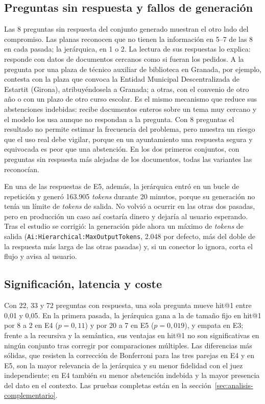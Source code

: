 \subsection{Preguntas sin respuesta y fallos de generación}
\label{sec:resultados-fallos}

Las 8 preguntas sin respuesta del conjunto generado muestran el otro lado del compromiso. Las planas reconocen que no tienen la información en 5--7 de las 8 en cada pasada; la jerárquica, en 1 o 2. La lectura de sus respuestas lo explica: responde con datos de documentos cercanos como si fueran los pedidos. A la pregunta por una plaza de técnico auxiliar de biblioteca en Granada, por ejemplo, contesta con la plaza que convoca la Entidad Municipal Descentralizada de Estartit (Girona), atribuyéndosela a Granada; a otras, con el convenio de otro año o con un plazo de otro curso escolar. Es el mismo mecanismo que reduce sus abstenciones indebidas: recibe documentos enteros sobre un tema muy cercano y el modelo los usa aunque no respondan a la pregunta. Con 8 preguntas el resultado no permite estimar la frecuencia del problema, pero muestra un riesgo que el uso real debe vigilar, porque en un ayuntamiento una respuesta segura y equivocada es peor que una abstención. En los dos primeros conjuntos, con preguntas sin respuesta más alejadas de los documentos, todas las variantes las reconocían.

En una de las respuestas de E5, además, la jerárquica entró en un bucle de repetición y generó 163.905 \emph{tokens} durante 20 minutos, porque su generación no tenía un límite de \emph{tokens} de salida. No volvió a ocurrir en las otras dos pasadas, pero en producción un caso así costaría dinero y dejaría al usuario esperando. Tras el estudio se corrigió: la generación pide ahora un máximo de \emph{tokens} de salida (\texttt{Ai:Hierarchical:MaxOutputTokens}, 2.048 por defecto, más del doble de la respuesta más larga de las otras pasadas) y, si un conector lo ignora, corta el flujo y avisa al usuario.

\subsection{Significación, latencia y coste}
\label{sec:resultados-significacion}

Con 22, 33 y 72 preguntas con respuesta, una sola pregunta mueve hit@1 entre 0,01 y 0,05. En la primera pasada, la jerárquica gana a la de tamaño fijo en hit@1 por 8 a 2 en E4 ($p = 0{,}11$) y por 20 a 7 en E5 ($p = 0{,}019$), y empata en E3; frente a la recursiva y la semántica, sus ventajas en hit@1 no son significativas en ningún conjunto tras corregir por comparaciones múltiples. Las diferencias más sólidas, que resisten la corrección de Bonferroni para las tres parejas en E4 y en E5, son la mayor relevancia de la jerárquica y su menor fidelidad con el juez independiente; en E4 también su menor abstención indebida y la mayor presencia del dato en el contexto. Las pruebas completas están en la sección~\ref{sec:analisis-complementario}.

